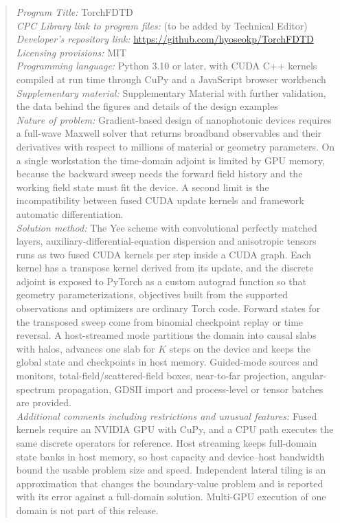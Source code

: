 \documentclass[preprint,11pt]{elsarticle}
\begin{document}
\begin{frontmatter}
\begin{abstract}
\begin{small}
\noindent
{\em Program Title:} TorchFDTD\\
{\em CPC Library link to program files:} (to be added by Technical Editor)\\
{\em Developer's repository link:} \url{https://github.com/hyoseokp/TorchFDTD}\\
{\em Licensing provisions:} MIT\\
{\em Programming language:} Python 3.10 or later, with CUDA C++ kernels compiled at run time through CuPy and a JavaScript browser workbench\\
{\em Supplementary material:} Supplementary Material with further validation, the data behind the figures and details of the design examples\\
{\em Nature of problem:} Gradient-based design of nanophotonic devices requires a full-wave Maxwell solver that returns broadband observables and their derivatives with respect to millions of material or geometry parameters. On a single workstation the time-domain adjoint is limited by GPU memory, because the backward sweep needs the forward field history and the working field state must fit the device. A second limit is the incompatibility between fused CUDA update kernels and framework automatic differentiation.\\
{\em Solution method:} The Yee scheme with convolutional perfectly matched layers, auxiliary-differential-equation dispersion and anisotropic tensors runs as two fused CUDA kernels per step inside a CUDA graph. Each kernel has a transpose kernel derived from its update, and the discrete adjoint is exposed to PyTorch as a custom autograd function so that geometry parameterizations, objectives built from the supported observations and optimizers are ordinary Torch code. Forward states for the transposed sweep come from binomial checkpoint replay or time reversal. A host-streamed mode partitions the domain into causal slabs with halos, advances one slab for $K$ steps on the device and keeps the global state and checkpoints in host memory. Guided-mode sources and monitors, total-field/scattered-field boxes, near-to-far projection, angular-spectrum propagation, GDSII import and process-level or tensor batches are provided.\\
{\em Additional comments including restrictions and unusual features:} Fused kernels require an NVIDIA GPU with CuPy, and a CPU path executes the same discrete operators for reference. Host streaming keeps full-domain state banks in host memory, so host capacity and device--host bandwidth bound the usable problem size and speed. Independent lateral tiling is an approximation that changes the boundary-value problem and is reported with its error against a full-domain solution. Multi-GPU execution of one domain is not part of this release.
\end{small}
\end{abstract}


\end{frontmatter}
\end{document}

